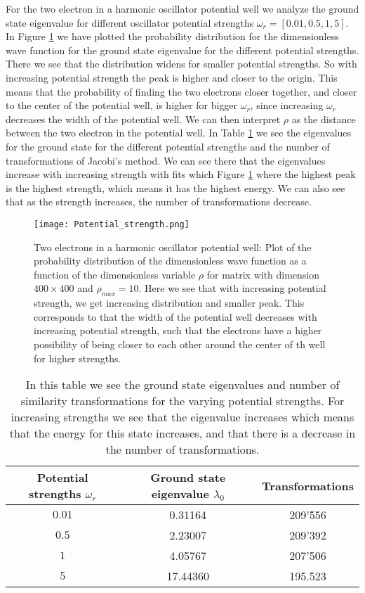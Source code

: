\documentclass[12pt,a4paper,english]{article}
\begin{document}
For the two electron in a harmonic oscillator potential well we analyze the ground state eigenvalue for different oscillator potential strengths $\omega_r=[0.01,0.5,1,5]$. In Figure \ref{fig:strengths} we have plotted the probability distribution for the dimensionless wave function for the ground state eigenvalue for the different potential strengths. There we see that the distribution widens for smaller potential strengths. So with increasing potential strength the peak is higher and closer to the origin. This means that the probability of finding the two electrons closer together, and closer to the center of the potential well, is higher for bigger $\omega_r$, since increasing $\omega_r$ decreases the width of the potential well. We can then interpret $\rho$ as the distance between the two electron in the potential well. In Table \ref{tab:ex_e} we see the eigenvalues for the ground state for the different potential strengths and the number of transformations of Jacobi's method. We can see there that the eigenvalues increase with increasing strength with fits which Figure \ref{fig:strengths} where the highest peak is the highest strength, which means it has the highest energy. We can also see that as the strength increases, the number of transformations decrease.

\begin{figure}[htbp]
	\centering\texttt{[image: Potential\_strength.png]}
	\caption{Two electrons in a harmonic oscillator potential well: Plot of the probability distribution of the dimensionless wave function as a function of the dimensionless variable $\rho$ for matrix with dimension $400\times400$ and $\rho_{max}=10$. Here we see that with increasing potential strength, we get increasing distribution and smaller peak. This corresponds to that the width of the potential well decreases with increasing potential strength, such that the electrons have a higher possibility of being closer to each other around the center of th well for higher strengths. \label{fig:strengths}}
\end{figure}

\begin{table}[htbp]
	\centering
	\begin{tabular}{ |c|c|c| }
		\hline \rule{0pt}{13pt}
		Potential strengths $\omega_r$ & Ground state eigenvalue $\lambda_0$ & Transformations \\
		\hline \rule{0pt}{13pt}
		$0.01$ & 0.31164 & 209'556 \\
		\hline \rule{0pt}{13pt}
		$0.5$ & 2.23007 & 209'392 \\
		\hline \rule{0pt}{13pt}
		$1$ & 4.05767 & 207'506 \\
		\hline \rule{0pt}{13pt}
		$5$ & 17.44360 & 195.523 \\
		\hline 
	\end{tabular}	
	\caption{In this table we see the ground state eigenvalues and number of similarity transformations for the varying potential strengths. For increasing strengths we see that the eigenvalue increases which means that the energy for this state increases, and that there is a decrease in the number of transformations.}
	\label{tab:ex_e}
\end{table}
\end{document}
